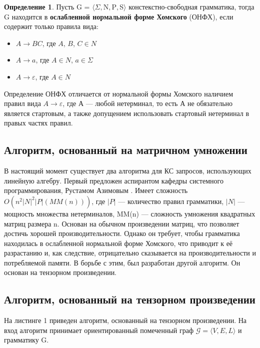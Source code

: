 \documentclass[14pt]{matmex-diploma}
\theoremstyle{definition}
\newtheorem{definition}{Определение}[section]
\begin{document}
\begin{definition}
Пусть G = $\langle \Sigma, $N$, $P$, $S$ \rangle$ констекстно-свободная грамматика, тогда G находится в \textbf{ослабленной нормальной форме Хомского} (ОНФХ), если содержит только правила вида:
\begin{itemize}
    \item $A \rightarrow BC$, где $A$, $B$, $C \in N$
    \item $A \rightarrow a$, где $A \in N$, $a \in \Sigma$
    \item $A \rightarrow \varepsilon$, где $A \in N$
\end{itemize}
\end{definition}

Определение ОНФХ отличается от нормальной формы Хомского наличием правил вида $A \rightarrow \varepsilon$, где А --- любой нетерминал, то есть А не обязательно является стартовым, а также допущением использовать стартовый нетерминал в правых частях правил.

\subsection{Алгоритм, основанный на матричном умножении}

В настоящий момент существует два алгоритма для КС запросов, использующих линейную алгебру. Первый предложен аспирантом кафедры системного программирования, Рустамом Азимовым \cite{alg_matrix}. Имеет сложность $O(n^{2}|N|^{2}|P|(MM(n)))$, где $|P|$ --- количество правил грамматики, $|N|$ --- мощность множества нетерминалов, MM(n) --- сложность умножения квадратных матриц размера n. Основан на обычном произведении матриц, что позволяет достичь хорошей производительности. Однако он требует, чтобы грамматика находилась в ослабленной нормальной форме Хомского, что приводит к её разрастанию и, как следствие, отрицательно сказывается на производительности и потребляемой памяти. В борьбе с этим, был разработан другой алгоритм. Он основан на тензорном произведении.

\subsection{Алгоритм, основанный на тензорном произведении}

На листинге 1 приведен алгоритм, основанный на тензорном произведении. На вход алгоритм принимает ориентированный помеченный граф $\mathcal{G} = \langle V, E, L \rangle$ и грамматику G.
\end{document}
